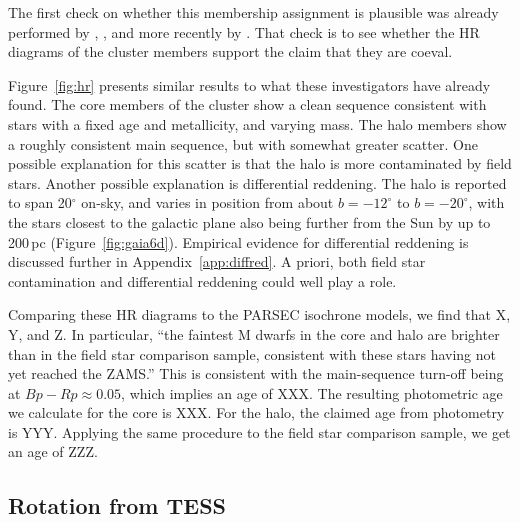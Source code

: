 \documentclass[12pt,twocolumn,tighten]{aastex63}
\begin{document}
The first check on whether this membership assignment is plausible was
already performed by ,
, and more recently by
\citet{meingast_2021}.  That check is to see whether the HR diagrams
of the cluster members support the claim that they are coeval.

Figure~\ref{fig:hr} presents similar results to what these
investigators have already found.  The core members of the cluster
show a clean sequence consistent with stars with a fixed age and
metallicity, and varying mass.  The halo members show a roughly
consistent main sequence, but with somewhat greater scatter.  One
possible explanation for this scatter is that the halo is more
contaminated by field stars.  Another possible explanation is
differential reddening.  The halo is reported to span 20$^\circ$
on-sky, and varies in position from about $b=-12^\circ$ to
$b=-20^\circ$, with the stars closest to the galactic plane also being
further from the Sun by up to 200\,pc (Figure~\ref{fig:gaia6d}).
Empirical evidence for differential reddening is discussed further in
Appendix~\ref{app:diffred}. A priori, both field star contamination
and differential reddening could well play a role.

Comparing these HR diagrams to the PARSEC isochrone models, we find
that X, Y, and Z.
In particular, ``the faintest M dwarfs in the core and halo are
brighter than in the field star comparison sample, consistent with
these stars having not yet reached the ZAMS.''
This is consistent with the 
main-sequence turn-off being at $Bp-Rp\approx0.05$, which implies an
age of XXX.
The resulting photometric age we calculate for the core is XXX.
For the halo, the claimed age from photometry is YYY.
Applying the same procedure to the field star comparison sample,
we get an age of ZZZ.


\subsection{Rotation from TESS}
\label{subsec:tess}
\end{document}
